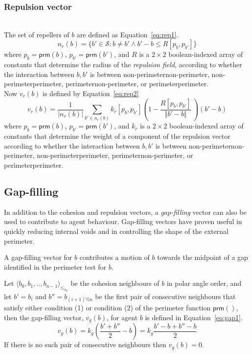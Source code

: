 \documentclass[12pt,a4paper]{IEEEtran}
\newcommand{\magn}[1]{\Vert{#1}\Vert}
\newcommand{\card}[1]{\vert{#1}\vert}
\newcommand{\vbb}[2]{#2-#1}
\newcommand{\pangle}{\mathit{\alpha}}
\newcommand{\leqaz}[3]{#2 \leq_{\pangle_#1} #3}
\newcommand{\angleordered}[2]{\langle #2 \rangle_{\leqaz{#1}{}{}}}
\newcommand{\prm}{\mathsf{prm}}
\newcommand{\kr}{\mathit{k_{r}}}
\newcommand{\kg}{\mathit{k_{g}}}
\newcommand{\rb}{\mathit{R}}
\begin{document}
\subsubsection{Repulsion vector}~\\
The set of repellers of $b$ are defined as Equation~\ref{eq:rep1}.
\small
\begin{equation}\label{eq:rep1}
	n_r(b) = \{b' \in \mathcal{S} : b \neq b' \wedge \vbb{b}{b'} \leq \rb[p_b,p_{b'}]\}
\end{equation}
\normalsize
where $p_b = \prm(b)$, $p_{b'} = \prm(b')$, and $\rb$ is a $2\times 2$ boolean-indexed array of constants that determine the radius of the \emph{repulsion field}, according to whether the interaction between $b,b'$ is between non-perimeter\textrightarrow non-perimeter, non-perimeter\textrightarrow perimeter,
perimeter\textrightarrow non-perimeter, or perimeter\textrightarrow perimeter.\\

Now $v_r(b)$ is defined by Equation~\ref{eq:rep2}
\small
\begin{equation}\label{eq:rep2}
	v_r(b) = \frac{1}{\card{n_r(b)}}\sum_{b' \in n_r(b)} \kr[p_b,p_{b'}] \left(1 - \frac{\rb[p_b,p_{b'}]}{\magn{\vbb{b}{b'}}} \, \right) (\vbb{b}{b'})
\end{equation}
\normalsize
where $p_b = \prm(b)$, $p_{b'} = \prm(b')$, and $\kr$ is a $2\times 2$ boolean-indexed array of constants that determine the weight of a component of the repulsion vector according to whether the interaction between $b,b'$ is between non-perimeter\textrightarrow non-perimeter, non-perimeter\textrightarrow perimeter, perimeter\textrightarrow non-perimeter, or perimeter\textrightarrow perimeter.

\subsection{Gap-filling}
In addition to the cohesion and repulsion vectors, a \emph{gap-filling} vector can also be used to contribute to agent behaviour. Gap-filling vectors have proven useful in quickly reducing internal voids and in controlling the shape of the external perimeter.

A gap-filling vector for $b$ contributes a motion of $b$ towards the midpoint of a gap identified in the perimeter test for $b$.

Let $\angleordered{b}{b_0, b_1, .., b_{n-1}}$ be the cohesion neighbours of $b$ in polar angle order, and let $b' = b_i$  and $b'' = b_{(i+1)\%n}$ be the first pair of consecutive neighbours that satisfy either condition (1) or condition (2) of the perimeter function $\prm()$, then the gap-filling vector, $v_g(b)$, for agent $b$ is defined in Equation~\ref{eq:gap1}.
\small
\begin{equation}\label{eq:gap1}
v_g(b) = \kg \left (\frac{b' + b''}{2} - b \right) = \kg \frac{\vbb{b}{b'} + \vbb{b}{b''}}{2} 
\end{equation}
\normalsize
If there is no such pair of consecutive neighbours then $v_g(b) = 0$.
\end{document}
